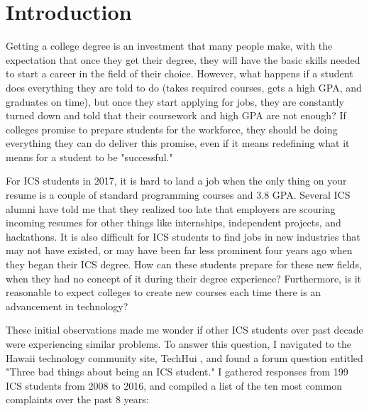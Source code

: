 \chapter{Introduction}
\label{introduction}

Getting a college degree is an investment that many people make, with the expectation that once they get their degree, they will have the basic skills needed to start a career in the field of their choice. However, what happens if a student does everything they are told to do (takes required courses, gets a high GPA, and graduates on time), but once they start applying for jobs, they are constantly turned down and told that their coursework and high GPA are not enough? If colleges promise to prepare students for the workforce, they should be doing everything they can do deliver this promise, even if it means redefining what it means for a student to be "successful."   

For ICS students in 2017, it is hard to land a job when the only thing on your resume is a couple of standard programming courses and 3.8 GPA. Several ICS alumni have told me that they realized too late that employers are scouring incoming resumes for other things like internships, independent projects, and hackathons. It is also difficult for ICS students to find jobs in new industries that may not have existed, or may have been far less prominent four years ago when they began their ICS degree. How can these students prepare for these new fields, when they had no concept of it during their degree experience? Furthermore, is it reasonable to expect colleges to create new courses each time there is an advancement in technology?

These initial observations made me wonder if other ICS students over past decade were experiencing similar problems. To answer this question, I navigated to the Hawaii technology community site, TechHui \cite {TechHuiQuestions}, and found a forum question entitled "Three bad things about being an ICS student." I gathered responses from 199 ICS students from 2008 to 2016, and compiled a list of the ten most common complaints over the past 8 years:

